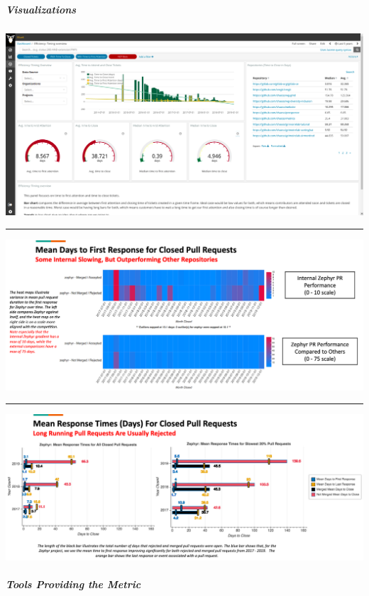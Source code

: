 \hypertarget{visualizations}{%
\subparagraph{Visualizations}\label{visualizations}}

\includegraphics{images/time-to-first-response_efficiency-timing-overview.png}

\begin{center}\rule{0.5\linewidth}{0.5pt}\end{center}

\includegraphics{images/time-to-first-response_augur-ttc-1.png}

\begin{center}\rule{0.5\linewidth}{0.5pt}\end{center}

\includegraphics{images/time-to-first-response_augur-ttc-2.png}

\hypertarget{tools-providing-the-metric}{%
\subparagraph{Tools Providing the
Metric}\label{tools-providing-the-metric}}

